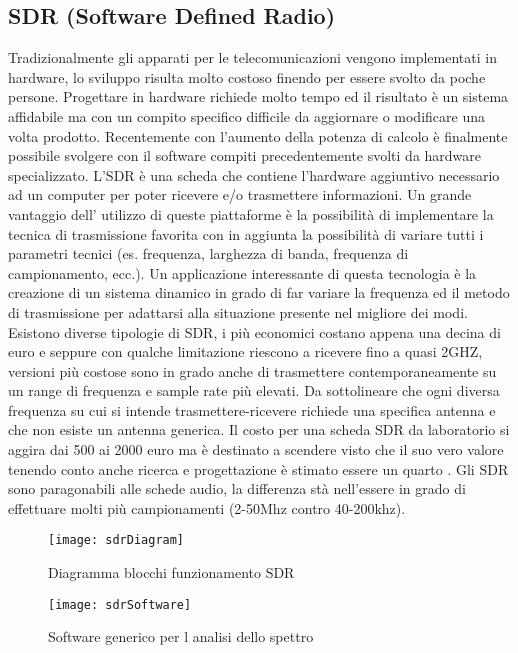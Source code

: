 \begin{itemize}
\chapter{SDR (Software Defined Radio)} Tradizionalmente gli apparati per le telecomunicazioni vengono implementati in hardware, lo sviluppo risulta molto costoso finendo per essere svolto da poche persone. Progettare in hardware richiede molto tempo ed il risultato è un sistema affidabile ma con un compito specifico difficile da aggiornare o modificare una volta prodotto. Recentemente con l'aumento della potenza di calcolo è finalmente possibile svolgere con il software compiti precedentemente svolti da hardware specializzato. L'SDR è una scheda che contiene l'hardware aggiuntivo necessario ad un computer per poter ricevere e/o trasmettere informazioni. Un grande vantaggio dell' utilizzo di queste piattaforme è la possibilità di implementare la tecnica di trasmissione favorita con in aggiunta la possibilità di variare tutti i parametri tecnici (es. frequenza, larghezza di banda, frequenza di campionamento, ecc.). Un applicazione interessante di questa tecnologia è la creazione di un sistema dinamico in grado di far variare la frequenza ed il metodo di trasmissione per adattarsi alla situazione presente nel migliore dei modi. Esistono diverse tipologie di SDR, i più economici costano appena una decina di euro e seppure con qualche limitazione riescono a ricevere fino a quasi 2GHZ, versioni più costose sono in grado anche di trasmettere contemporaneamente su un range di frequenza e sample rate più elevati. Da sottolineare che ogni diversa frequenza su cui si intende trasmettere-ricevere richiede una specifica antenna e che non esiste un antenna generica.
Il costo per una scheda SDR da laboratorio si aggira dai 500 ai 2000 euro ma è destinato a scendere visto che il suo vero valore tenendo conto anche ricerca e progettazione è stimato essere un quarto \cite{SdrDrugs}.
Gli SDR sono paragonabili alle schede audio, la differenza stà nell'essere in grado di effettuare molti più campionamenti (2-50Mhz contro 40-200khz).
\begin{figure}[h]
	\centering
	\begin{minipage}[b]{.5\columnwidth}
		\texttt{[image: sdrDiagram]}
		\caption{Diagramma blocchi funzionamento SDR \cite{sdrDiagram}}\label{fig:1}
	\end{minipage}\hfill
	\begin{minipage}[b]{.4\columnwidth}
		\texttt{[image: sdrSoftware]}
		\caption{Software generico per l analisi dello spettro \cite{sdrSoftware}}\label{fig:1}

\end{minipage}
\end{figure}
\end{itemize}

